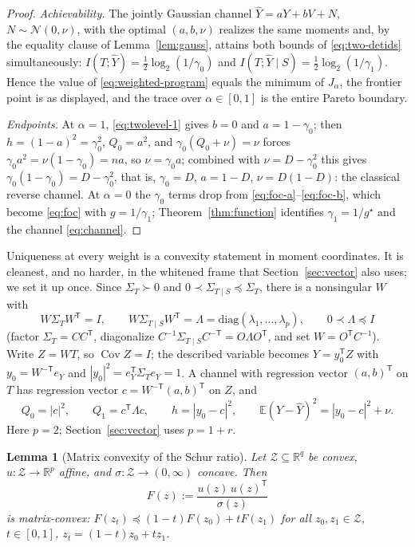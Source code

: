 ﻿\documentclass[11pt,onecolumn]{IEEEtran}
\newtheorem{lemma}[theorem]{Lemma}
\newcommand{\E}{\mathbb{E}}
\newcommand{\R}{\mathbb{R}}
\newcommand{\Cov}{\operatorname{Cov}}
\newcommand{\hY}{\widehat{Y}}
\begin{document}
\begin{proof}
\emph{Achievability.} The jointly Gaussian channel $\hY=aY+bV+N$,
$N\sim\mathcal N(0,\nu)$, with the optimal $(a,b,\nu)$ realizes the same
moments and, by the equality clause of Lemma~\ref{lem:gauss}, attains
both bounds of \eqref{eq:two-detids} simultaneously:
$I(T;\hY)=\tfrac12\log_2(1/\gamma_0)$ and
$I(T;\hY\mid S)=\tfrac12\log_2(1/\gamma_1)$. Hence the value of
\eqref{eq:weighted-program} equals the minimum of $J_\alpha$, the
frontier point is as displayed, and the trace over $\alpha\in[0,1]$ is
the entire Pareto boundary.

\emph{Endpoints.} At $\alpha=1$, \eqref{eq:twolevel-1} gives $b=0$ and
$a=1-\gamma_0$; then $h=(1-a)^2=\gamma_0^2$, $Q_0=a^2$, and
$\gamma_0(Q_0+\nu)=\nu$ forces $\gamma_0a^2=\nu(1-\gamma_0)=na$, so
$\nu=\gamma_0a$; combined with $\nu=D-\gamma_0^2$ this gives
$\gamma_0(1-\gamma_0)=D-\gamma_0^2$, that is, $\gamma_0=D$, $a=1-D$,
$\nu=D(1-D)$: the classical reverse channel. At $\alpha=0$ the
$\gamma_0$ terms drop from \eqref{eq:foc-a}--\eqref{eq:foc-b}, which
become \eqref{eq:foc} with $g=1/\gamma_1$; Theorem~\ref{thm:function}
identifies $\gamma_1=1/g^\star$ and the channel \eqref{eq:channel}.
\end{proof}

Uniqueness at every weight is a convexity statement in moment
coordinates. It is cleanest, and no harder, in the whitened frame that
Section~\ref{sec:vector} also uses; we set it up once. Since
$\Sigma_T\succ0$ and $0\prec\Sigma_{T\mid S}\preceq\Sigma_T$, there is
a nonsingular $W$ with
\begin{equation}
W\Sigma_TW^{\mathsf T}=I,
\qquad
W\Sigma_{T\mid S}W^{\mathsf T}
=\Lambda=\mathrm{diag}(\lambda_1,\dots,\lambda_p),
\qquad 0\prec\Lambda\preceq I
\label{eq:whitening}
\end{equation}
(factor $\Sigma_T=CC^{\mathsf T}$, diagonalize
$C^{-1}\Sigma_{T\mid S}C^{-\mathsf T}=O\Lambda O^{\mathsf T}$, and set
$W=O^{\mathsf T}C^{-1}$). Write $Z=WT$, so $\Cov Z=I$; the described
variable becomes
$Y=y_0^{\mathsf T}Z$ with $y_0=W^{-\mathsf T}e_Y$ and
$|y_0|^2=e_Y^{\mathsf T}\Sigma_Te_Y=1$. A channel with regression
vector $(a,b)^{\mathsf T}$ on $T$ has regression vector
$c=W^{-\mathsf T}(a,b)^{\mathsf T}$ on $Z$, and
\[
Q_0=|c|^2,\qquad Q_1=c^{\mathsf T}\Lambda c,\qquad
h=|y_0-c|^2,\qquad
\E(Y-\hY)^2=|y_0-c|^2+\nu .
\]
Here $p=2$; Section~\ref{sec:vector} uses $p=1+r$.

\begin{lemma}[Matrix convexity of the Schur ratio]\label{lem:mxconvex}
Let $\mathcal Z\subseteq\R^q$ be convex, $u:\mathcal Z\to\R^p$ affine,
and $\sigma:\mathcal Z\to(0,\infty)$ concave. Then
\[
F(z):=\frac{u(z)\,u(z)^{\mathsf T}}{\sigma(z)}
\]
is matrix-convex: $F(z_t)\preceq(1-t)F(z_0)+tF(z_1)$ for all
$z_0,z_1\in\mathcal Z$, $t\in[0,1]$, $z_t=(1-t)z_0+tz_1$.
\end{lemma}
\end{document}
